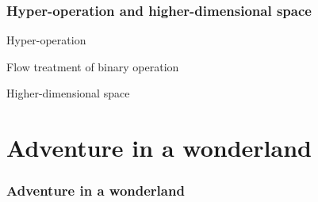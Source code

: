 \documentclass[aspectratio=169]{beamer}
\begin{document}
\begin{frame}
    \frametitle{Hyper-operation and higher-dimensional space}
    Hyper-operation

    Flow treatment of binary operation

    Higher-dimensional space
\end{frame}

\section{Adventure in a wonderland}

\begin{frame}
\frametitle{Adventure in a wonderland}
\begin{figure}[ht]\centering
{}
\end{figure}
\end{frame}
\end{document}
